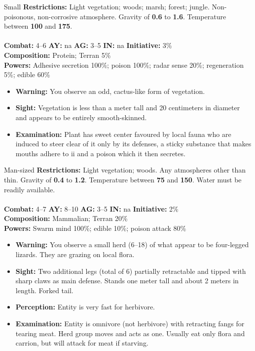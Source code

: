 \hrulefill

  \begin{creature}{Small}
    \textbf{Restrictions:} Light vegetation; woods; marsh; forest; jungle. Non-poisonous, non-corrosive atmosphere. Gravity of \textbf{0.6} to \textbf{1.6}. 
    Temperature between \textbf{100\textdegree} and \textbf{175\textdegree}. \\\\
    \textbf{Combat:} 4--6 \textbf{AY:} na \textbf{AG:} 3--5 \textbf{IN:} na \textbf{Initiative:} 3\% \\
    \textbf{Composition:} Protein; Terran 5\% \\
    \textbf{Powers:} Adhesive secretion 100\%; poison 100\%; radar sense 20\%; regeneration 5\%; edible 60\% 
    \begin{itemize}
    \item\textbf{Warning:} You observe an odd, cactus-like form of vegetation. 
    \item\textbf{Sight:} Vegetation is less than a meter tall and 20 centimeters in diameter and appears to be entirely smooth-skinned. 
    \item\textbf{Examination:} Plant has sweet center favoured by local fauna who are induced to steer clear of it only by its defenses, a sticky 
      substance that makes mouths adhere to ii and a poison which it then secretes. 
    \end{itemize}
  \end{creature}

\hrulefill

  \begin{creature}{Man-sized}
    \textbf{Restrictions:} Light vegetation; woods. Any atmospheres other than thin. Gravity of \textbf{0.4} to \textbf{1.2}. Temperature between \textbf{75\textdegree} and \textbf{150\textdegree}. 
    Water must be readily available. \\\\
    \textbf{Combat:} 4--7 \textbf{AY:} 8--10 \textbf{AG:} 3--5 \textbf{IN:} na \textbf{Initiative:} 2\% \\
    \textbf{Composition:} Mammalian; Terran 20\% \\
    \textbf{Powers:} Swarm mind 100\%; edible 10\%; poison attack 80\% 
    \begin{itemize}
    \item\textbf{Warning:} You observe a small herd (6--18) of what appear to be four-legged lizards. They are grazing on local flora. 
    \item\textbf{Sight:} Two additional legs (total of 6) partially retractable and tipped with sharp claws as main defense. Stands one meter tall and 
      about 2 meters in length. Forked tail. 
    \item\textbf{Perception:} Entity is very fast for herbivore. 
    \item\textbf{Examination:} Entity is omnivore (not herbivore) with retracting fangs for tearing meat. Herd group moves and acts as one. Usually 
      eat only flora and carrion, but will attack for meat if starving. 
    \end{itemize}
  \end{creature}

